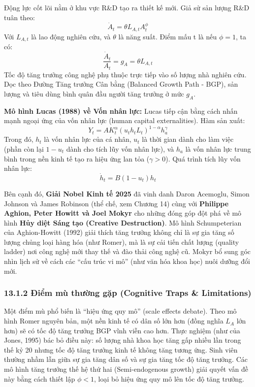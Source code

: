 \documentclass[
]{article}
\begin{document}
Động lực cốt lõi nằm ở khu vực R\&D tạo ra thiết kế mới. Giả sử sản
lượng R\&D tuân theo: \[ \dot{A}_t = \theta L_{A,t} A_t^\phi \] Với
\(L_{A,t}\) là lao động nghiên cứu, và \(\theta\) là năng suất. Điểm mấu
t là nếu \(\phi = 1\), ta có:
\[ \frac{\dot{A}_t}{A_t} = g_A = \theta L_{A,t} \] Tốc độ tăng trưởng
công nghệ phụ thuộc trực tiếp vào số lượng nhà nghiên cứu. Dọc theo
Đường Tăng trưởng Cân bằng (Balanced Growth Path - BGP), sản lượng và
tiêu dùng bình quân đầu người tăng trưởng ở mức \(g_A\).

\textbf{Mô hình Lucas (1988) về Vốn nhân lực:} Lucas tiếp cận bằng cách
nhấn mạnh ngoại ứng của vốn nhân lực (human capital externalities). Hàm
sản xuất: \[ Y_t = A K_t^\alpha (u_t h_t L_t)^{1-\alpha} h_a^\gamma \]
Trong đó, \(h_t\) là vốn nhân lực của cá nhân, \(u_t\) là thời gian dành
cho làm việc (phần còn lại \(1-u_t\) dành cho tích lũy vốn nhân lực), và
\(h_a\) là vốn nhân lực trung bình trong nền kinh tế tạo ra hiệu ứng lan
tỏa (\(\gamma > 0\)). Quá trình tích lũy vốn nhân lực:
\[ \dot{h}_t = B(1-u_t)h_t \]

Bên cạnh đó, \textbf{Giải Nobel Kinh tế 2025} đã vinh danh Daron
Acemoglu, Simon Johnson và James Robinson (thể chế, xem Chương 14) cùng
với \textbf{Philippe Aghion, Peter Howitt và Joel Mokyr} cho những đóng
góp đột phá về mô hình \textbf{Hủy diệt Sáng tạo (Creative
Destruction)}. Mô hình Schumpeterian của Aghion-Howitt (1992) giải thích
tăng trưởng không chỉ là sự gia tăng số lượng chủng loại hàng hóa (như
Romer), mà là sự cải tiến chất lượng (quality ladder) nơi công nghệ mới
thay thế và đào thải công nghệ cũ. Mokyr bổ sung góc nhìn lịch sử về
cách các ``cấu trúc vi mô'' (như văn hóa khoa học) nuôi dưỡng đổi mới.

\subsubsection{13.1.2 Điểm mù thường gặp (Cognitive Traps \&
Limitations)}\label{ux111iux1ec3m-muxf9-thux1b0ux1eddng-gux1eb7p-cognitive-traps-limitations-90}

Một điểm mù phổ biến là ``hiệu ứng quy mô'' (scale effects debate). Theo
mô hình Romer nguyên bản, một nền kinh tế có dân số lớn hơn (đồng nghĩa
\(L_A\) lớn hơn) sẽ có tốc độ tăng trưởng BGP vĩnh viễn cao hơn. Thực
nghiệm (như của Jones, 1995) bác bỏ điều này: số lượng nhà khoa học tăng
gấp nhiều lần trong thế kỷ 20 nhưng tốc độ tăng trưởng kinh tế không
tăng tương ứng. Sinh viên thường nhầm lẫn giữa sự gia tăng dân số và sự
gia tăng tốc độ tăng trưởng. Các mô hình tăng trưởng thế hệ thứ hai
(Semi-endogenous growth) giải quyết vấn đề này bằng cách thiết lập
\(\phi < 1\), loại bỏ hiệu ứng quy mô lên tốc độ tăng trưởng.
\end{document}
